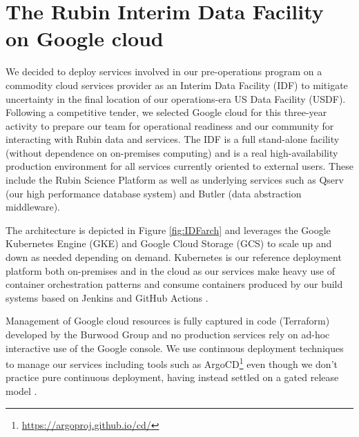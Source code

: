 \documentclass[11pt,twoside]{article}
\begin{document}
\section{The Rubin Interim Data Facility on Google cloud}

We decided to deploy services involved in our pre-operations program on a commodity cloud services provider as an Interim Data Facility (IDF) to mitigate uncertainty in the final location of our operations-era US Data Facility (USDF).
Following a competitive tender, we selected Google cloud for this three-year activity to prepare our team for operational readiness and our community for interacting with Rubin data and services.
The IDF is a full stand-alone facility (without dependence on on-premises computing) and is a real high-availability production environment for all services currently oriented to external users. These include the Rubin Science Platform as well as underlying services such as Qserv (our high performance database system) and Butler (data abstraction middleware).

The architecture is depicted in Figure \ref{fig:IDFarch} and leverages the Google Kubernetes Engine (GKE) and Google Cloud Storage (GCS) to scale up and down as needed depending on demand.
Kubernetes is our reference deployment platform both on-premises and in the cloud as our services make heavy use of container orchestration patterns and consume containers produced by our build systems based on Jenkins and GitHub Actions \citep[see e.g.,][]{2018SPIE10707E..09J}.

Management of Google cloud resources is fully captured in code (Terraform) developed by the Burwood Group and no production services rely on ad-hoc interactive use of the Google console. We use continuous deployment techniques to manage our services including tools such as ArgoCD\footnote{\url{https://argoproj.github.io/cd/}} even though we don't practice pure continuous deployment, having instead settled on a gated release model \citep{SQR-056}.

\end{document}
